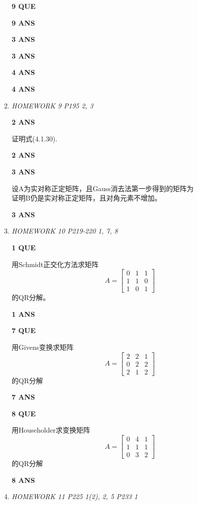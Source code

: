 \documentclass[11pt,letterpaper]{ctexart}
\begin{document}
\begin{enumerate}
\textbf{9 QUE}
\bigskip

\textbf{9 ANS}
\bigskip

\textbf{3 ANS}
\bigskip

\textbf{3 ANS}
\bigskip

\textbf{4 ANS}
\bigskip

\textbf{4 ANS}
\bigskip

\item \textit{HOMEWORK 9 {P195 2, 3}}%

\textbf{2 ANS}
\bigskip

证明式(4.1.30).

\textbf{2 ANS}
\bigskip


\textbf{3 ANS}
\bigskip

设A为实对称正定矩阵，且Gauss消去法第一步得到的矩阵为 \[ 
	\]
证明B仍是实对称正定矩阵，且对角元素不增加。

\textbf{3 ANS}
\bigskip



\item \textit{HOMEWORK 10 {P219-220 1, 7, 8}}%

\textbf{1 QUE}
\bigskip

用Schmidt正交化方法求矩阵 \[ A = \begin{bmatrix}
	0 & 1 & 1 \\
	1 & 1 & 0 \\
	1 & 0 & 1 
\end{bmatrix}\]的QR分解。

\textbf{1 ANS}
\bigskip

\textbf{7 QUE}
\bigskip

用Givens变换求矩阵
\[ A = \begin{bmatrix}
	2 & 2 & 1 \\
	0 & 2 & 2\\
	2 & 1 & 2
\end{bmatrix}\]的QR分解

\textbf{7 ANS}
\bigskip

\textbf{8 QUE}
\bigskip

用Householder求变换矩阵 \[ A = \begin{bmatrix}
	0 & 4 & 1 \\
	1 & 1 & 1 \\
	0 & 3 & 2
\end{bmatrix}\]的QR分解


\textbf{8 ANS}
\bigskip

\item \textit{HOMEWORK 11 {P225 1(2), 2, 5 P233 1}}%


\end{enumerate}
\end{document}
